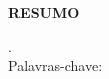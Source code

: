 \begin{center}
\textbf{RESUMO}
\end{center}
\singlespacing

\noindent . \\

\noindent Palavras-chave:

